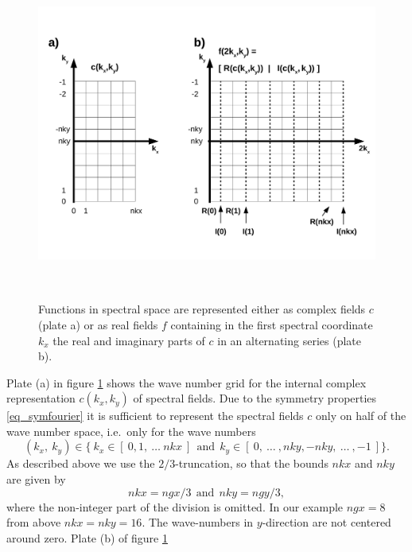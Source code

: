 \begin{figure} \label{fig_ctorspecgrid}
   \includegraphics[height=11cm]{figures/cmplx_real_spec_grid.pdf}
   \caption{Functions in spectral space are represented either as
            complex fields $c$ (plate a) or as real fields $f$ containing 
            in the first spectral coordinate $k_{x}$ the real and 
            imaginary parts of $c$ in an alternating series (plate b).}
\end{figure}
Plate (a) in figure \ref{fig_ctorspecgrid} shows the wave number
grid for the internal complex representation $c(k_{x},k_{y})$ 
of spectral fields. Due to the symmetry properties \ref{eq_symfourier} 
it is sufficient to represent the spectral fields $c$ only on half of 
the wave number space, i.e.\ only for the wave numbers 
\begin{equation} \label{eq_ncentwgrid}
   (k_{x},\ k_{y}) \in  
   \{\ k_{x} \in [\ 0,1,\ \dots \ nkx \ ] \ \ \mbox{and} \ \ 
   k_{y} \in [\ 0, \ \dots \ ,nky,-nky, \ \dots \ , -1 \ ] \}.
\end{equation}
As described above we use the $2/3$-truncation, so that the bounds 
$nkx$ and $nky$ are given by  
\begin{equation} \label{eq_nkxnky}
   nkx = ngx/3 \ \ \mbox{and} \ \ nky = ngy/3,
\end{equation}
where the non-integer part of the division is omitted. In our example 
$ngx=8$ from above $nkx = nky = 16$. The wave-numbers in $y$-direction 
are not centered around zero. Plate (b) of figure \ref{fig_ctorspecgrid} 
